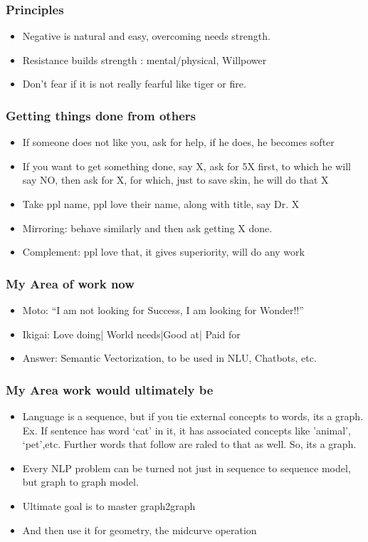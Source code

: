 \begin{frame}[fragile]\frametitle{Principles}
\begin{itemize}
\item Negative is natural and easy, overcoming needs strength. 
\item Resistance builds strength : mental/physical, Willpower
\item Don't fear if it is not really fearful like tiger or fire.
\end{itemize}
\end{frame}

\begin{frame}[fragile]\frametitle{Getting things done from others}
\begin{itemize}
\item If someone does not like you, ask for help, if he does, he becomes softer
\item If you want to get something done, say X, ask for 5X first, to which he will say NO, then ask for X, for which, just to save skin, he will do that X
\item Take ppl name, ppl love their name, along with title, say Dr. X
\item Mirroring: behave similarly and then ask getting X done.
\item Complement: ppl love that, it gives superiority, will do any work
\end{itemize}
\end{frame}

\begin{frame}[fragile]\frametitle{My Area of work now}
\begin{itemize}
\item Moto: ``I am not looking for Success, I am looking for Wonder!!''
\item Ikigai: Love doing| World needs|Good at| Paid for
\item Answer: Semantic Vectorization, to be used in NLU, Chatbots, etc.
\end{itemize}
\end{frame}

\begin{frame}[fragile]\frametitle{My Area work would ultimately be}
\begin{itemize}
\item Language is a sequence, but if you tie external concepts to words, its a graph. Ex. If sentence has word `cat' in it, it has associated concepts like 'animal', `pet',etc. Further words that follow are raled to that as well. So, its a graph.
\item Every NLP problem can be turned not just in sequence to sequence model, but graph to graph model. 
\item Ultimate goal is to master graph2graph 
\item And then use it for geometry, the midcurve operation
\end{itemize}
\end{frame}

